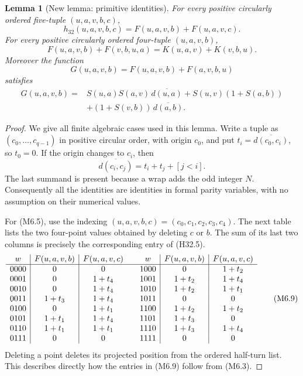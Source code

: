 \documentclass[11pt,oneside]{report}
\newtheorem{lemma}[theorem]{Lemma}
\theoremstyle{definition}
\numberwithin{equation}{section}
\begin{document}
\begin{lemma}[New lemma: primitive identities]\label{J21:lem:m6-primitives}
For every positive circularly ordered five-tuple $(u,a,v,b,c)$,
\[
 h_{32}(u,a,v,b,c)=F(u,a,v,b)+F(u,a,v,c).
 \tag{M6.5}
\]
For every positive circularly ordered four-tuple $(u,a,v,b)$,
\[
 F(u,a,v,b)+F(v,b,u,a)=K(u,a,v)+K(v,b,u).
 \tag{M6.6}
\]
Moreover the function
\[
 G(u,a,v,b)=F(u,a,v,b)+F(a,v,b,u)
\]
satisfies
\[
\begin{split}
 G(u,a,v,b)={}&S(u,a)S(a,v)\,\overline{d(u,a)}
       +S(u,v)(1+S(a,b))\\
       &+(1+S(v,b))\,\overline{d(a,b)}.
\end{split}
 \tag{M6.7}
\]
\end{lemma}
\begin{proof}
We give all finite algebraic cases used in this lemma.
Write a tuple as $(c_0,\ldots,c_{q-1})$ in positive circular order,
with origin $c_0$, and put $t_i=\overline{d(c_0,c_i)}$, so $t_0=0$.
If the origin changes to $c_i$, then
\[
 \overline{d(c_i,c_j)}=t_i+t_j+[j<i].
 \tag{M6.8}
\]
The last summand is present because a wrap adds the odd integer $N$.
Consequently all the identities are identities in formal parity
variables, with no assumption on their numerical values.

For (M6.5), use the indexing $(u,a,v,b,c)=(c_0,c_1,c_2,c_3,c_4)$.
The next table lists the two four-point values obtained by deleting
$c$ or $b$. The sum of its last two columns is precisely the
corresponding entry of (H32.5).
\[
\begin{array}{c|c|c@{\qquad}c|c|c}
 w&F(u,a,v,b)&F(u,a,v,c)&w&F(u,a,v,b)&F(u,a,v,c)\\ \hline
 0000&0&0&1000&0&1+t_2\\
 0001&0&1+t_4&1001&1+t_2&1+t_4\\
 0010&0&1+t_4&1010&1+t_2&1+t_1\\
 0011&1+t_3&1+t_4&1011&0&0\\
 0100&0&1+t_1&1100&1+t_2&1+t_2\\
 0101&1+t_1&1+t_4&1101&1+t_3&0\\
 0110&1+t_1&1+t_1&1110&1+t_3&1+t_4\\
 0111&0&0&1111&0&0
\end{array}
 \tag{M6.9}
\]
Deleting a point deletes its projected position from the ordered
half-turn list. This describes directly how the entries in (M6.9)
follow from (M6.3).


\end{proof}
\end{document}
